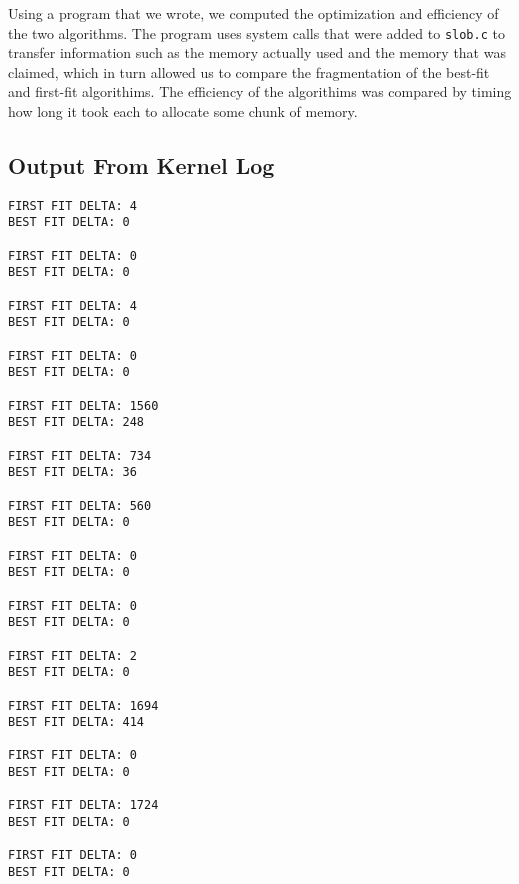 \documentclass[11pt,letterpaper]{article}
\begin{document}
\par Using a program that we wrote, we computed the optimization and efficiency
of the two algorithms. The program uses system calls that were added to
\verb|slob.c| to transfer information such as the memory actually used and the
memory that was claimed, which in turn allowed us to compare the fragmentation
of the best-fit and first-fit algorithims. The efficiency of the algorithims
was compared by timing how long it took each to allocate some chunk of memory.


\subsection*{Output From Kernel Log}

{\small
\begin{verbatim}
FIRST FIT DELTA: 4
BEST FIT DELTA: 0

FIRST FIT DELTA: 0
BEST FIT DELTA: 0

FIRST FIT DELTA: 4
BEST FIT DELTA: 0

FIRST FIT DELTA: 0
BEST FIT DELTA: 0

FIRST FIT DELTA: 1560
BEST FIT DELTA: 248

FIRST FIT DELTA: 734
BEST FIT DELTA: 36

FIRST FIT DELTA: 560
BEST FIT DELTA: 0

FIRST FIT DELTA: 0
BEST FIT DELTA: 0

FIRST FIT DELTA: 0
BEST FIT DELTA: 0

FIRST FIT DELTA: 2
BEST FIT DELTA: 0

FIRST FIT DELTA: 1694
BEST FIT DELTA: 414

FIRST FIT DELTA: 0
BEST FIT DELTA: 0

FIRST FIT DELTA: 1724
BEST FIT DELTA: 0

FIRST FIT DELTA: 0
BEST FIT DELTA: 0


\end{verbatim}
}
\end{document}
